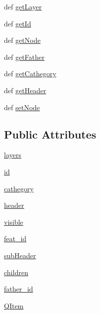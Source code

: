 \begin{DoxyCompactItemize}
\item 
def \hyperlink{classAlbero_1_1Tree_1_1Nodo_a77688d3ecdfab7c0f7dc099576aeb134}{getLayer}
\item 
def \hyperlink{classAlbero_1_1Tree_1_1Nodo_a13d79a31b2dc6f2eb00cd8c8748cf4af}{getId}
\item 
def \hyperlink{classAlbero_1_1Tree_1_1Nodo_a663d34a649dcbd4158e92b383215ab6d}{getNode}
\item 
def \hyperlink{classAlbero_1_1Tree_1_1Nodo_a00f6523b8fb7241f77b34efd09b694b9}{getFather}
\item 
def \hyperlink{classAlbero_1_1Tree_1_1Nodo_a215dba56870352eafff7dcad09dd123e}{getCathegory}
\item 
def \hyperlink{classAlbero_1_1Tree_1_1Nodo_ae3906f2629af656abbc082f43fda216c}{getHeader}
\item 
def \hyperlink{classAlbero_1_1Tree_1_1Nodo_ae2f52f34cacb435e008954391c888a25}{setNode}
\end{DoxyCompactItemize}
\subsection*{Public Attributes}
\begin{DoxyCompactItemize}
\item 
\hyperlink{classAlbero_1_1Tree_1_1Nodo_ac9409df437a4a6cdc19d85ce6e784664}{layers}
\item 
\hyperlink{classAlbero_1_1Tree_1_1Nodo_a31ae6c5e36f9292385025aa0a8e13eb7}{id}
\item 
\hyperlink{classAlbero_1_1Tree_1_1Nodo_a0cc92fe6ea62bba13b1390dd22e9c8d1}{cathegory}
\item 
\hyperlink{classAlbero_1_1Tree_1_1Nodo_a4200bc60c009199d9b0355ccb60ab796}{header}
\item 
\hyperlink{classAlbero_1_1Tree_1_1Nodo_ad02885a4409430a783fe4a78598409de}{visible}
\item 
\hyperlink{classAlbero_1_1Tree_1_1Nodo_a27b33969937149060801485411e96c47}{feat\_\-id}
\item 
\hyperlink{classAlbero_1_1Tree_1_1Nodo_ab53f2d038d2e0acbde66f59845c5bfd5}{subHeader}
\item 
\hyperlink{classAlbero_1_1Tree_1_1Nodo_acbcbe35d72823080e82d43126e129526}{children}
\item 
\hyperlink{classAlbero_1_1Tree_1_1Nodo_a497e9d6dc5bf9790b48ad0b982694495}{father\_\-id}
\item 
\hyperlink{classAlbero_1_1Tree_1_1Nodo_a737a9928f71a79ff5dd5ac0e7905b455}{QItem}
\end{DoxyCompactItemize}


